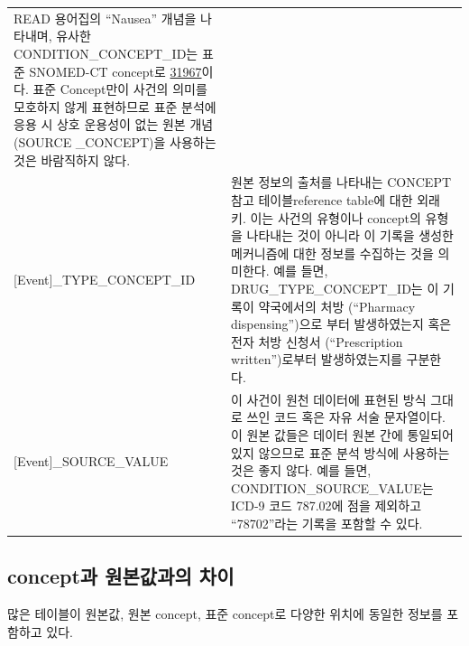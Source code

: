 \documentclass[11pt]{book}
\theoremstyle{definition}
\theoremstyle{definition}
\theoremstyle{definition}
\theoremstyle{remark}
\begin{document}
\begin{longtable}[]{@{}ll@{}}
\begin{minipage}[t]{0.60\columnwidth}
READ 용어집의 ``Nausea'' 개념을 나타내며, 유사한
CONDITION\_CONCEPT\_ID는 표준 SNOMED-CT concept로
\href{http://athena.ohdsi.org/search-terms/terms/31967}{31967}이다. 표준
Concept만이 사건의 의미를 모호하지 않게 표현하므로 표준 분석에 응용 시
상호 운용성이 없는 원본 개념(SOURCE \_CONCEPT)을 사용하는 것은
바람직하지 않다.\strut
\end{minipage}\tabularnewline
\begin{minipage}[t]{0.34\columnwidth}\raggedright\strut
{[}Event{]}\_TYPE\_CONCEPT\_ID\strut
\end{minipage} & \begin{minipage}[t]{0.60\columnwidth}\raggedright\strut
원본 정보의 출처를 나타내는 CONCEPT 참고 테이블reference table에 대한
외래 키. 이는 사건의 유형이나 concept의 유형을 나타내는 것이 아니라 이
기록을 생성한 메커니즘에 대한 정보를 수집하는 것을 의미한다. 예를 들면,
DRUG\_TYPE\_CONCEPT\_ID는 이 기록이 약국에서의 처방 (``Pharmacy
dispensing'')으로 부터 발생하였는지 혹은 전자 처방 신청서
(``Prescription written'')로부터 발생하였는지를 구분한다.\strut
\end{minipage}\tabularnewline
\begin{minipage}[t]{0.34\columnwidth}\raggedright\strut
{[}Event{]}\_SOURCE\_VALUE\strut
\end{minipage} & \begin{minipage}[t]{0.60\columnwidth}\raggedright\strut
이 사건이 원천 데이터에 표현된 방식 그대로 쓰인 코드 혹은 자유 서술
문자열이다. 이 원본 값들은 데이터 원본 간에 통일되어 있지 않으므로 표준
분석 방식에 사용하는 것은 좋지 않다. 예를 들면,
CONDITION\_SOURCE\_VALUE는 ICD-9 코드 787.02에 점을 제외하고
``78702''라는 기록을 포함할 수 있다.\strut
\end{minipage}\tabularnewline
\bottomrule
\end{longtable}

\subsection{concept과 원본값과의 차이}\label{concepts-Sources}

많은 테이블이 원본값, 원본 concept, 표준 concept로 다양한 위치에 동일한
정보를 포함하고 있다.
\end{document}
